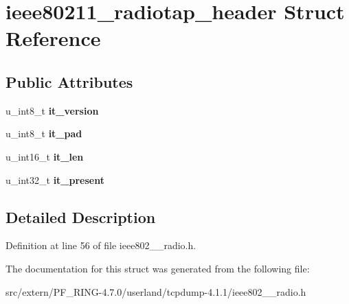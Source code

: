 \hypertarget{structieee80211__radiotap__header}{
\section{ieee80211\_\-radiotap\_\-header Struct Reference}
\label{structieee80211__radiotap__header}
}
\subsection*{Public Attributes}
\begin{DoxyCompactItemize}
\item 
\hypertarget{structieee80211__radiotap__header_adf54753968c8fe4087181ccd9dae8aa2}{
u\_\-int8\_\-t {\bfseries it\_\-version}}
\label{structieee80211__radiotap__header_adf54753968c8fe4087181ccd9dae8aa2}

\item 
\hypertarget{structieee80211__radiotap__header_a359ab8f1a7e42703a2b0b046aa7745df}{
u\_\-int8\_\-t {\bfseries it\_\-pad}}
\label{structieee80211__radiotap__header_a359ab8f1a7e42703a2b0b046aa7745df}

\item 
\hypertarget{structieee80211__radiotap__header_abfba72560e4293caf406d77c6a9525b7}{
u\_\-int16\_\-t {\bfseries it\_\-len}}
\label{structieee80211__radiotap__header_abfba72560e4293caf406d77c6a9525b7}

\item 
\hypertarget{structieee80211__radiotap__header_a009d016edc455b006f90cd6cb75e8bce}{
u\_\-int32\_\-t {\bfseries it\_\-present}}
\label{structieee80211__radiotap__header_a009d016edc455b006f90cd6cb75e8bce}

\end{DoxyCompactItemize}


\subsection{Detailed Description}


Definition at line 56 of file ieee802\_\_\-radio.h.



The documentation for this struct was generated from the following file:\begin{DoxyCompactItemize}
\item 
src/extern/PF\_\-RING-\/4.7.0/userland/tcpdump-\/4.1.1/ieee802\_\_\-radio.h\end{DoxyCompactItemize}
